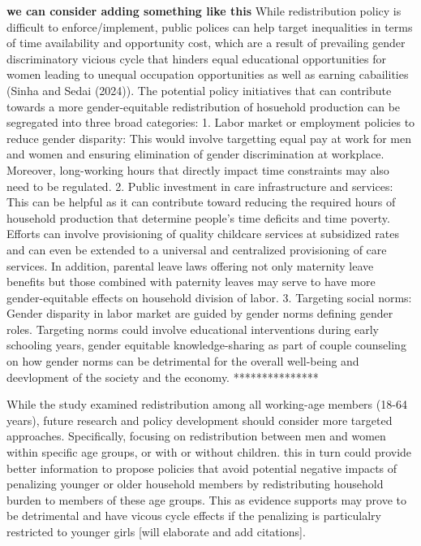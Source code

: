 \documentclass[
  11pt,
]{article}
\begin{document}
\textbf{we can consider adding something like this} While redistribution
policy is difficult to enforce/implement, public polices can help target
inequalities in terms of time availability and opportunity cost, which
are a result of prevailing gender discriminatory vicious cycle that
hinders equal educational opportunities for women leading to unequal
occupation opportunities as well as earning cabailities (Sinha and Sedai
(2024)). The potential policy initiatives that can contribute towards a
more gender-equitable redistribution of hosuehold production can be
segregated into three broad categories: 1. Labor market or employment
policies to reduce gender disparity: This would involve targetting equal
pay at work for men and women and ensuring elimination of gender
discrimination at workplace. Moreover, long-working hours that directly
impact time constraints may also need to be regulated. 2. Public
investment in care infrastructure and services: This can be helpful as
it can contribute toward reducing the required hours of household
production that determine people's time deficits and time poverty.
Efforts can involve provisioning of quality childcare services at
subsidized rates and can even be extended to a universal and centralized
provisioning of care services. In addition, parental leave laws offering
not only maternity leave benefits but those combined with paternity
leaves may serve to have more gender-equitable effects on household
division of labor. 3. Targeting social norms: Gender disparity in labor
market are guided by gender norms defining gender roles. Targeting norms
could involve educational interventions during early schooling years,
gender equitable knowledge-sharing as part of couple counseling on how
gender norms can be detrimental for the overall well-being and
deevlopment of the society and the economy. ***************

While the study examined redistribution among all working-age members
(18-64 years), future research and policy development should consider
more targeted approaches. Specifically, focusing on redistribution
between men and women within specific age groups, or with or without
children. this in turn could provide better information to propose
policies that avoid potential negative impacts of penalizing younger or
older household members by redistributing household burden to members of
these age groups. This as evidence supports may prove to be detrimental
and have vicous cycle effects if the penalizing is particulalry
restricted to younger girls {[}will elaborate and add citations{]}.
\end{document}
